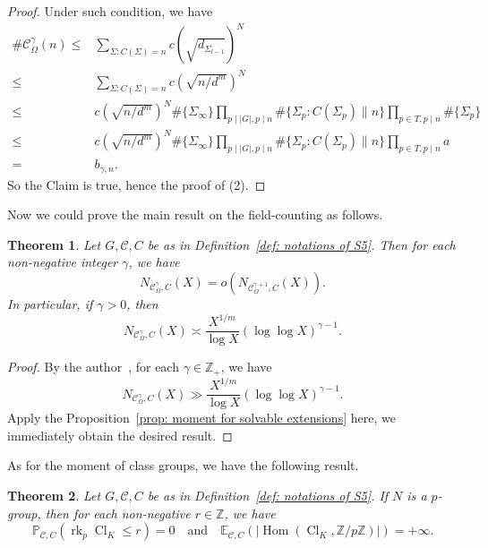 \documentclass[12pt,a4paper]{amsart}
\numberwithin{equation}{section}%
\theoremstyle{plain}%
\newtheorem{theorem}{Theorem}[section]%
\theoremstyle{definition}%
\theoremstyle{remark}%
\begin{document}
\begin{proof}
    	Under such condition, we have
    	\begin{align*}
    		\#\mathcal{C}_{\Omega}^{\gamma}(n)\leq &\sum_{\Sigma:C(\Sigma)=n} c(\sqrt{d_{\Sigma_{l-1}}})^{N} \\
    		\leq & \sum_{\Sigma:C(\Sigma)=n}c(\sqrt{n/d^{m}})^{N} \\
    		\leq & c(\sqrt{n/d^{m}})^{N}\#\{\Sigma_{\infty}\}\prod_{p\mid\lvert G\rvert,p\mid n}\#\{\Sigma_{p}: C(\Sigma_{p})\|n\}\prod_{p\in T,p\mid n}\#\{\Sigma_{p}\} \\
    		\leq & c(\sqrt{n/d^{m}})^{N}\#\{\Sigma_{\infty}\}\prod_{p\mid\lvert G\rvert,p\mid n}\#\{\Sigma_{p}: C(\Sigma_{p})\|n\}\prod_{p\in T,p\mid n}a \\
    		=& b_{\gamma,n}.
    	\end{align*}
    	So the Claim is true, hence the proof of (2).
    \end{proof}
    Now we could prove the main result on the field-counting as follows.
    \begin{theorem}\label{thm: proof of the hypothesis S5}
    	Let $G,\mathcal{C},C$ be as in Definition~\ref{def: notations of S5}.
    	Then for each non-negative integer $\gamma$, we have
    	\begin{equation*}
    		N_{\mathcal{C}_{\Omega}^{\gamma},C}(X)=o(N_{\mathcal{C}_{\Omega}^{\gamma+1},C}(X)).
    	\end{equation*}
    	In particular, if $\gamma>0$, then
    	\begin{equation*}
    		N_{\mathcal{C}_{\Omega}^{\gamma},C}(X)\asymp\frac{X^{1/m}}{\log X}(\log\log X)^{\gamma-1}.
    	\end{equation*}
    \end{theorem}
    \begin{proof}
    	By the author~\cite[Lemma 7.11]{wang2026invariant}, for each $\gamma\in\mathbb{Z}_{+}$, we have
    	\begin{equation*}
    		N_{\mathcal{C}_{\Omega}^{\gamma},C}(X)\gg \frac{{X}^{1/m}}{\log X}(\log\log X)^{\gamma-1}.
    	\end{equation*}
    	Apply the Proposition~\ref{prop: moment for solvable extensions} here, we immediately obtain the desired result.
    \end{proof}
    As for the moment of class groups, we have the following result.
    \begin{theorem}\label{thm: zero-probability and infinite moment S5}
    	Let $G,\mathcal{C},C$ be as in Definition~\ref{def: notations of S5}.
    	If $N$ is a $p$-group, then for each non-negative $r\in\mathbb{Z}$, we have
    	\begin{equation*}
    		\mathbb{P}_{\mathcal{C},C}(\operatorname{rk}_{p}\operatorname{Cl}_{K}\leq r)=0\quad\text{and}\quad \mathbb{E}_{\mathcal{C},C}(\lvert\operatorname{Hom}(\operatorname{Cl}_{K},\mathbb{Z}/p\mathbb{Z})\rvert)=+\infty.
    	\end{equation*}
    \end{theorem}
\end{document}
